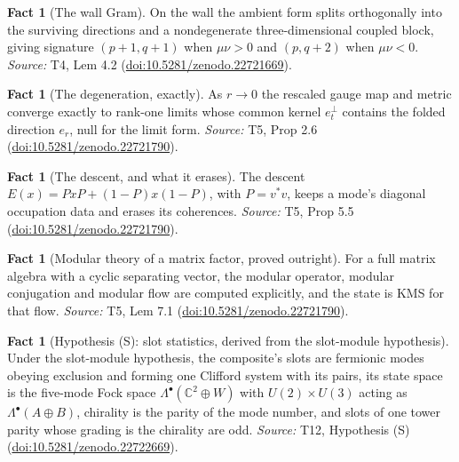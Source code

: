 \documentclass[11pt]{article}
\theoremstyle{definition}
\newtheorem{fact}[theorem]{Fact}
\theoremstyle{plain}
\providecommand{\C}{}\renewcommand{\C}{\mathbb{C}}
\providecommand{\er}{}\renewcommand{\er}{e_r}
\providecommand{\et}{}\renewcommand{\et}{e_t}
\begin{document}
\begin{fact}[The wall Gram]\label{c:sheaf.wall-gram}
On the wall the ambient form splits orthogonally into the surviving directions and a nondegenerate three-dimensional coupled block, giving signature $(p{+}1, q{+}1)$ when $\mu\nu > 0$ and $(p, q{+}2)$ when $\mu\nu < 0$.
\emph{Source:} T4, Lem 4.2 (\href{https://doi.org/10.5281/zenodo.22721669}{doi:10.5281/zenodo.22721669}).
\end{fact}

\begin{fact}[The degeneration, exactly]\label{c:singularity.degeneration-exactly}
As $r \to 0$ the rescaled gauge map and metric converge exactly to rank-one limits whose common kernel $\et^{\perp}$ contains the folded direction $\er$, null for the limit form.
\emph{Source:} T5, Prop 2.6 (\href{https://doi.org/10.5281/zenodo.22721790}{doi:10.5281/zenodo.22721790}).
\end{fact}

\begin{fact}[The descent, and what it erases]\label{c:singularity.descent-what-it-erases}
The descent $E(x) = PxP + (1-P)x(1-P)$, with $P = v^* v$, keeps a mode's diagonal occupation data and erases its coherences.
\emph{Source:} T5, Prop 5.5 (\href{https://doi.org/10.5281/zenodo.22721790}{doi:10.5281/zenodo.22721790}).
\end{fact}

\begin{fact}[Modular theory of a matrix factor, proved outright]\label{c:singularity.modular-theory-matrix-factor-proved-outright}
For a full matrix algebra with a cyclic separating vector, the modular operator, modular conjugation and modular flow are computed explicitly, and the state is KMS for that flow.
\emph{Source:} T5, Lem 7.1 (\href{https://doi.org/10.5281/zenodo.22721790}{doi:10.5281/zenodo.22721790}).
\end{fact}

\begin{fact}[Hypothesis (S): slot statistics, derived from the slot-module hypothesis]\label{c:standard-model.hyp-s-slot-statistics}
Under the slot-module hypothesis, the composite's slots are fermionic modes obeying exclusion and forming one Clifford system with its pairs, its state space is the five-mode Fock space $\Lambda^{\bullet}(\C^{2} \oplus W)$ with $U(2) \times U(3)$ acting as $\Lambda^{\bullet}(A \oplus B)$, chirality is the parity of the mode number, and slots of one tower parity whose grading is the chirality are odd.
\emph{Source:} T12, Hypothesis (S) (\href{https://doi.org/10.5281/zenodo.22722669}{doi:10.5281/zenodo.22722669}).
\end{fact}
\end{document}
